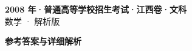 \documentclass[zihao=-4, a4paper]{ctexart}
\begin{document}
\begin{center}
  {\Large\bfseries 2008 年·普通高等学校招生考试·江西卷·文科}\\[4pt]
  {\large 数学 · 解析版}
\end{center}
\medskip
{}

\clearpage
{}
\begin{center}{\Large\bfseries 参考答案与详细解析}\end{center}
\medskip

\end{document}
